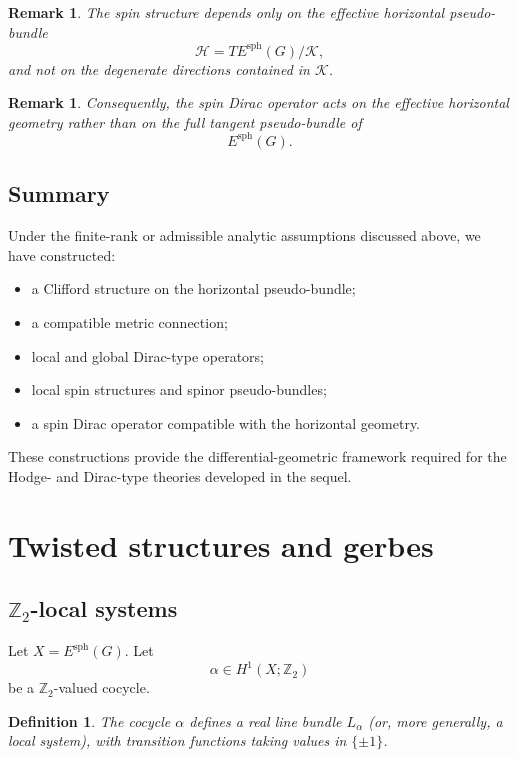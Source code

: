 \documentclass[11pt]{amsart}
\newtheorem{definition}[theorem]{Definition}
\newtheorem{remark}[theorem]{Remark}
\begin{document}
\begin{remark}
The spin structure depends only on the effective horizontal pseudo-bundle
\[
\mathcal H
=
TE^{\mathrm{sph}}(G)/\mathcal K,
\]
and not on the degenerate directions contained in \(\mathcal K\).
\end{remark}

\begin{remark}
Consequently, the spin Dirac operator acts on the effective horizontal
geometry rather than on the full tangent pseudo-bundle of
\[
E^{\mathrm{sph}}(G).
\]
\end{remark}

\subsection{Summary}

Under the finite-rank or admissible analytic assumptions discussed above, we
have constructed:
\begin{itemize}
\item a Clifford structure on the horizontal pseudo-bundle;
\item a compatible metric connection;
\item local and global Dirac-type operators;
\item local spin structures and spinor pseudo-bundles;
\item a spin Dirac operator compatible with the horizontal geometry.
\end{itemize}

These constructions provide the differential-geometric framework required for
the Hodge- and Dirac-type theories developed in the sequel.
\section{Twisted structures and gerbes}

\subsection{$\mathbb{Z}_2$-local systems}

Let $X = E^{\mathrm{sph}}(G)$. Let
\[
\alpha \in H^1(X;\mathbb{Z}_2)
\]
be a $\mathbb{Z}_2$-valued cocycle.

\begin{definition}
The cocycle $\alpha$ defines a real line bundle $L_\alpha$ (or, more generally, a local system), with transition functions taking values in $\{\pm 1\}$.
\end{definition}
\end{document}
